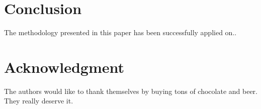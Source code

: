 \documentclass[conference]{IEEEtran}
\begin{document}
\section{Conclusion}
\label{sec:conclusion}

The methodology presented in this paper has been successfully applied on.. 


\section*{Acknowledgment}
\label{sec:acknowledgment}

The authors would like to thank themselves by buying tons of chocolate
and beer. They really deserve it. 



%
%
%
%





\end{document}
